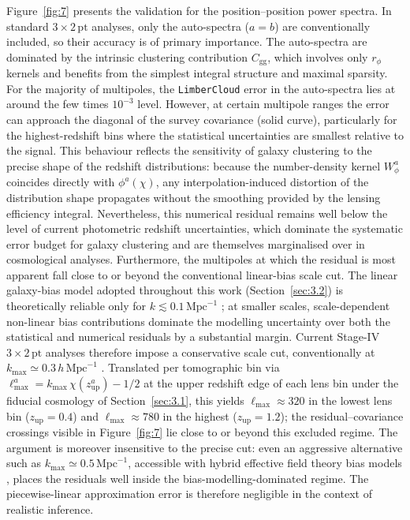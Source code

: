 Figure~\ref{fig:7} presents the validation for the position--position power spectra. In standard \(3\times2\,\mathrm{pt}\) analyses, only the auto-spectra (\(a = b\)) are conventionally included, so their accuracy is of primary importance. The auto-spectra are dominated by the intrinsic clustering contribution \(C_\mathrm{gg}\), which involves only \(r_\phi\) kernels and benefits from the simplest integral structure and maximal sparsity. For the majority of multipoles, the \texttt{LimberCloud} error in the auto-spectra lies at around the few times \(10^{-3}\) level. However, at certain multipole ranges the error can approach the diagonal of the survey covariance (solid curve), particularly for the highest-redshift bins where the statistical uncertainties are smallest relative to the signal. This behaviour reflects the sensitivity of galaxy clustering to the precise shape of the redshift distributions: because the number-density kernel \(W_\phi^a\) coincides directly with \(\phi^a(\chi)\), any interpolation-induced distortion of the distribution shape propagates without the smoothing provided by the lensing efficiency integral. Nevertheless, this numerical residual remains well below the level of current photometric redshift uncertainties, which dominate the systematic error budget for galaxy clustering and are themselves marginalised over in cosmological analyses. Furthermore, the multipoles at which the residual is most apparent fall close to or beyond the conventional linear-bias scale cut. The linear galaxy-bias model adopted throughout this work (Section~\ref{sec:3.2}) is theoretically reliable only for \(k \lesssim 0.1\,\mathrm{Mpc}^{-1}\) \citep{2022PhRvD.105l3518G}; at smaller scales, scale-dependent non-linear bias contributions dominate the modelling uncertainty over both the statistical and numerical residuals by a substantial margin. Current Stage-IV \(3\times2\,\mathrm{pt}\) analyses therefore impose a conservative scale cut, conventionally at \(k_{\mathrm{max}} \simeq 0.3\,h\,\mathrm{Mpc}^{-1}\) \citep{2009arXiv0912.0201L, 2022PhRvD.105b3520A}. Translated per tomographic bin via \(\ell_{\mathrm{max}}^a = k_{\mathrm{max}}\,\chi(z_{\mathrm{up}}^a) - 1/2\) at the upper redshift edge of each lens bin under the fiducial cosmology of Section~\ref{sec:3.1}, this yields \(\ell_{\mathrm{max}} \approx 320\) in the lowest lens bin (\(z_{\mathrm{up}} = 0.4\)) and \(\ell_{\mathrm{max}} \approx 780\) in the highest (\(z_{\mathrm{up}} = 1.2\)); the residual--covariance crossings visible in Figure~\ref{fig:7} lie close to or beyond this excluded regime. The argument is moreover insensitive to the precise cut: even an aggressive alternative such as \(k_{\mathrm{max}} \simeq 0.5\,\mathrm{Mpc}^{-1}\), accessible with hybrid effective field theory bias models \citep{2024JCAP...02..015N}, places the residuals well inside the bias-modelling-dominated regime. The piecewise-linear approximation error is therefore negligible in the context of realistic inference.

